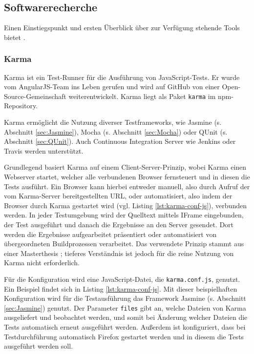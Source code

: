 \subsection{Softwarerecherche}
Einen Einstiegspunkt und ersten Überblick über zur Verfügung stehende Tools bietet \cite{unittest-overview}.

\subsubsection{Karma}
\label{sec:Karma}
Karma ist ein Test-Runner für die Ausführung von JavaScript-Tests. Er wurde vom AngularJS-Team ins Leben gerufen und wird auf GitHub von einer Open-Source-Gemeinschaft weiterentwickelt.\cite{karma-index} Karma liegt als Paket \texttt{karma} im npm-Repository\cite{karma-faq}.

Karma ermöglicht die Nutzung diverser Testframeworks, wie Jasmine (s. Abschnitt \ref{sec:Jasmine}), Mocha (s. Abschnitt \ref{sec:Mocha}) oder QUnit (s. Abschnitt \ref{sec:QUnit}). Auch Continuous Integration Server wie Jenkins oder Travis werden unterstützt.\cite{karma-faq}

Grundlegend basiert Karma auf einem Client-Server-Prinzip, wobei Karma einen Webserver startet, welcher alle verbundenen Browser fernsteuert und in diesen die Tests ausführt. Ein Browser kann hierbei entweder manuell, also durch Aufruf der vom Karma-Server bereitgestellten URL, oder automatisiert, also indem der Browser durch Karma gestartet wird (vgl. Listing \ref{lst:karma-conf-js}), verbunden werden. In jeder Testumgebung wird der Quelltext mittels IFrame eingebunden, der Test ausgeführt und danach die Ergebnisse an den Server gesendet. Dort werden die Ergebnisse aufgearbeitet präsentiert oder automatisiert von übergeordneten Buildprozessen verarbeitet. Das verwendete Prinzip stammt aus einer Masterthesis \cite{karma-masterThesis}; tieferes Verständnis ist jedoch für die reine Nutzung von Karma nicht erforderlich.\cite{karma-howItWorks}

Für die Konfiguration wird eine JavaScript-Datei, die \texttt{karma.conf.js}, genutzt. Ein Beispiel findet sich in Listing \ref{lst:karma-conf-js}. Mit dieser beispielhaften Konfiguration wird für die Testausführung das Framework Jasmine (s. Abschnitt \ref{sec:Jasmine}) genutzt. Der Parameter \texttt{files} gibt an, welche Dateien von Karma ausgeliefert und beobachtet werden, und somit bei Änderung welcher Dateien die Tests automatisch erneut ausgeführt werden. Außerdem ist konfiguriert, dass bei Testdurchführung automatisch Firefox gestartet werden und in diesem die Tests ausgeführt werden soll.\cite{karma-configurationFile, karma-files}

